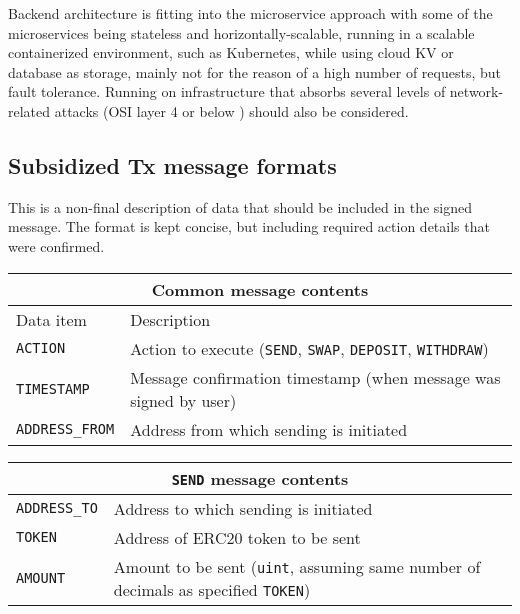 \documentclass[12pt]{article}
\begin{document}
Backend architecture is fitting into the microservice approach with some of the microservices being stateless and horizontally-scalable, running in a scalable containerized environment, such as Kubernetes, while using cloud KV or database as storage, mainly not for the reason of a high number of requests, but fault tolerance. Running on infrastructure that absorbs several levels of network-related attacks (OSI layer 4 or below \cite{OSI_model} \cite{gcp_protection}) should also be considered.


\subsection{Subsidized Tx message formats}


This is a non-final description of data that should be included in the signed message. The format is kept concise, but including required action details that were confirmed.

\medskip

\begin{tabular}{ |p{3cm}|p{9cm}|  }
 \hline
 \multicolumn{2}{|c|}{Common message contents} \\
 \hline
 Data item& Description\\
 \hline
 \texttt{ACTION}& Action to execute (\texttt{SEND}, \texttt{SWAP}, \texttt{DEPOSIT}, \texttt{WITHDRAW})\\
 \texttt{TIMESTAMP}& Message confirmation timestamp (when message was signed by user)\\
 \texttt{ADDRESS\_FROM}& Address from which sending is initiated\\
 \hline
\end{tabular}


\begin{tabular}{ |p{3cm}|p{9cm}|  }
 \hline
 \multicolumn{2}{|c|}{\texttt{SEND} message contents} \\
 \hline
 \texttt{ADDRESS\_TO}& Address to which sending is initiated\\
 \texttt{TOKEN}& Address of ERC20 token to be sent\\
 \texttt{AMOUNT}& Amount to be sent (\texttt{uint}, assuming same number of decimals as specified \texttt{TOKEN})\\
 \hline
\end{tabular}
\end{document}
